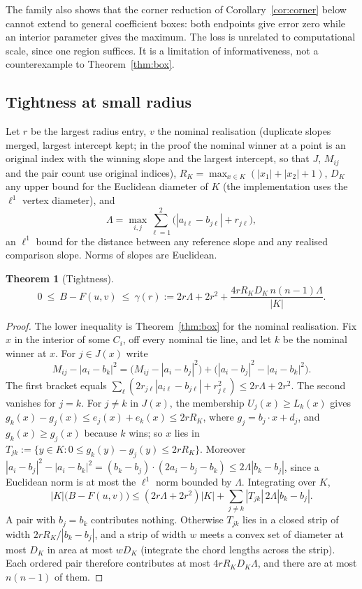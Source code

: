 \documentclass[11pt]{article}
\newtheorem{theorem}{Theorem}
\theoremstyle{remark}
\newcommand{\Lam}{\Lambda}
\begin{document}
The family also shows that the corner reduction of
Corollary~\ref{cor:corner} below cannot extend to general coefficient boxes:
both endpoints give error zero while an interior parameter gives the maximum.
The loss is unrelated to computational scale, since one region suffices. It is
a limitation of informativeness, not a counterexample to Theorem~\ref{thm:box}.

\subsection{Tightness at small radius}
Let $r$ be the largest radius entry, $v$ the nominal realisation (duplicate
slopes merged, largest intercept kept; in the proof the nominal winner at a
point is an original index with the winning slope and the largest intercept,
so that $J$, $M_{ij}$ and the pair count use original indices),
$R_K=\max_{x\in K}(|x_1|+|x_2|+1)$,
$D_K$ any upper bound for the Euclidean diameter of $K$ (the implementation
uses the $\ell^1$ vertex diameter), and
\[
 \Lam=\max_{i,j}\sum_{\ell=1}^2\big(|a_{i\ell}-b_{j\ell}|+r_{j\ell}\big),
\]
an $\ell^1$ bound for the distance between any reference slope and any
realised comparison slope. Norms of slopes are Euclidean.

\begin{theorem}[Tightness]\label{thm:tight}
\begin{equation}\label{eq:gamma}
 0\ \le\ B-F(u,v)\ \le\ \gamma(r):=2r\Lam+2r^2+\frac{4rR_KD_K\,n(n-1)\Lam}{|K|}.
\end{equation}
\end{theorem}
\begin{proof}
The lower inequality is Theorem~\ref{thm:box} for the nominal realisation. Fix
$x$ in the interior of some $C_i$, off every nominal tie line, and let $k$ be
the nominal winner at $x$. For $j\in J(x)$ write
\[
 M_{ij}-|a_i-b_k|^2=\big(M_{ij}-|a_i-b_j|^2\big)+\big(|a_i-b_j|^2-|a_i-b_k|^2\big).
\]
The first bracket equals $\sum_\ell(2r_{j\ell}|a_{i\ell}-b_{j\ell}|+r_{j\ell}^2)
\le2r\Lam+2r^2$. The second vanishes for $j=k$. For $j\ne k$ in $J(x)$, the
membership $U_j(x)\ge L_k(x)$ gives $g_k(x)-g_j(x)\le e_j(x)+e_k(x)\le2rR_K$,
where $g_j=b_j\cdot x+d_j$, and $g_k(x)\ge g_j(x)$ because $k$ wins; so $x$
lies in $T_{jk}:=\{y\in K:0\le g_k(y)-g_j(y)\le2rR_K\}$. Moreover
$|a_i-b_j|^2-|a_i-b_k|^2=(b_k-b_j)\cdot(2a_i-b_j-b_k)\le2\Lam|b_k-b_j|$,
since a Euclidean norm is at most the $\ell^1$ norm bounded by $\Lam$.
Integrating over $K$,
\[
 |K|\big(B-F(u,v)\big)\le(2r\Lam+2r^2)|K|+\sum_{j\ne k}|T_{jk}|\,2\Lam|b_k-b_j|.
\]
A pair with $b_j=b_k$ contributes nothing. Otherwise $T_{jk}$ lies in a closed
strip of width $2rR_K/|b_k-b_j|$, and a strip of width $w$ meets a convex set
of diameter at most $D_K$ in area at most $wD_K$ (integrate the chord lengths
across the strip). Each ordered pair therefore contributes at most
$4rR_KD_K\Lam$, and there are at most $n(n-1)$ of them.
\end{proof}
\end{document}
